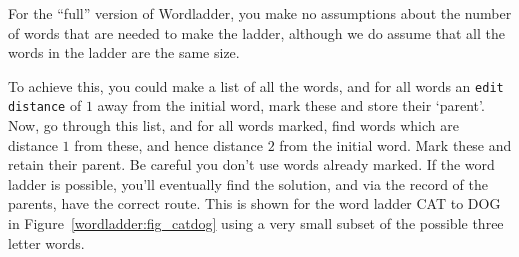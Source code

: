 

For the ``full'' version of Wordladder, you make no assumptions
about the number of words that are needed to make the ladder, although
we do assume that all the words in the ladder are the same size.

\begin{exercise}
To achieve this, you could make a
list of all the words, and for all words an \verb^edit distance^ of $1$ away from
the initial word, mark these and store their `parent'. Now, go through
this list, and for all words marked, find words which are distance $1$
from these, and hence distance $2$ from the initial word. Mark these and
retain their parent. Be careful you don't use words
already marked. If the word ladder is possible, you'll eventually find the
solution, and via the record of the parents, have the correct route.
This is shown for the word ladder CAT to DOG in Figure~\ref{wordladder:fig_catdog}
using a very small subset of the possible three letter words.
\end{exercise}

